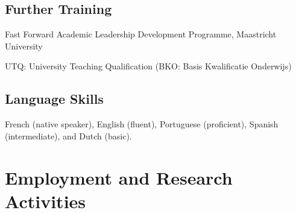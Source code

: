 \documentclass[11pt,a4paper]{article}
\begin{document}
\subsection{Further Training}
\begin{datelist}
  \item[2015 -- 2016] Fast Forward Academic Leadership Development Programme, Maastricht University
  \item[2014 -- 2015] UTQ: University Teaching Qualification (BKO: Basis Kwalificatie Onderwijs)
\end{datelist}

\subsection{Language Skills}
French (native speaker), English (fluent), Portuguese (proficient), Spanish (intermediate), and Dutch (basic).

\section{Employment and Research Activities}
\end{document}
